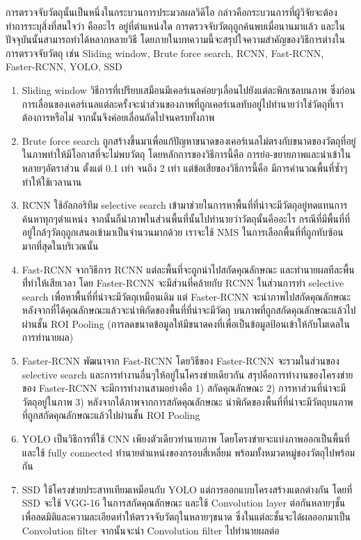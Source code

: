 การตรวจจับวัตถุนั้นเป็นหนึ่งในกระบวนการประมวลผลวิดีโอ\textsuperscript{\cite{object_detection}} กล่าวคือกระบวนการที่ผู้วิจัยจะต้องทำการระบุสิ่งที่สนใจว่า คืออะไร อยู่ที่ตำแหน่งใด การตรวจจับวัตถุถูกค้นพบเมื่อนานมาแล้ว 
และในปัจจุบันนั้นสามารถทำได้หลากหลายวิธี โดยภายในบทความนี้จะสรุปใจความสำคัญของวิธีการต่างในการตรวจจับวัตถุ เช่น Sliding window, Brute force search, RCNN, 
Fast-RCNN, Faster-RCNN, YOLO, SSD 
\begin{enumerate}
	\item Sliding window วิธีการที่เปรียบเสมือนมีเคอร์เนลค่อยๆเลื่อนไปยังแต่ละพิกเซลบนภาพ ซึ่งก่อนการเลื่อนของเคอร์เนลแต่ละครั้งจะนำส่วนของภาพที่ถูกเคอร์เนลทับอยู่ไปทำนายว่าใช่วัตถุที่เราต้องการหรือไม่ 
	จากนั้นจึงค่อยเลื่อนถัดไปจนครบทั้งภาพ
	\item Brute force search ถูกสร้างขึ้นมาเพื่อแก้ปัญหาขนาดของเคอร์เนลไม่ตรงกับขนาดของวัตถุที่อยู่ในภาพทำให้มีโอกาสที่จะไม่พบวัตถุ โดยหลักการของวิธีการนี้คือ 
	การย่อ-ขยายภาพและนำเข้าในหลายๆอัตราส่วน ตั้งแต่ 0.1 เท่า จนถึง 2 เท่า แต่ข้อเสียของวิธีการนี้คือ มีการคำนวณพื้นที่ซ้ำๆทำให้ใช้เวลานาน
	\item RCNN ใช้อัลกอริทึม selective search เข้ามาช่วยในการหาพื้นที่ที่น่าจะมีวัตถุอยู่ทดแทนการค้นหาทุกๆตำแหน่ง จากนั้นก็นำภาพในส่วนพื้นที่นั้นไปทำนายว่าวัตถุนั้นคืออะไร 
	กรณีที่มีพื้นที่ที่อยู่ใกล้ๆวัตถุถูกเสนอเข้ามาเป็นจำนวนมากด้วย เราจะใช้ NMS ในการเลือกพื้นที่ที่ถูกทับซ้อนมากที่สุดในบริเวณนั้น
	\item Fast-RCNN จากวิธีการ RCNN แต่ละพื้นที่จะถูกนำไปสกัดคุณลักษณะ และทำนายผลทีละพื้นที่่ทำให้เสียเวลา โดย Faster-RCNN จะมีส่วนที่คล้ายกับ RCNN ในส่วนการทำ 
	selective search เพื่อหาพื้นที่ที่น่าจะมีวัตถุเหมือนเดิม แต่ Faster-RCNN จะนำภาพไปสกัดคุณลักษณะ หลังจากที่ได้คุณลักษณะแล้วจะนำพิกัดของพื้นที่ที่น่าจะมีวัตถุ 
	บนภาพที่ถูกสกัดคุณลักษณะแล้วไปผ่านชั้น ROI Pooling (การลดขนาดข้อมูลให้มีขนาดคงที่เพื่อเป็นข้อมูลป้อนเข้าให้กับโมเดลในการทำนายผล)
	\item Faster-RCNN พัฒนาจาก Fast-RCNN โดยวิธีของ Faster-RCNN จะรวมในส่วนของ selective search และการทำงานอื่นๆให้อยู่ในโครงข่ายเดียวกัน 
	สรุปคือการทำงานของโครงข่ายของ Faster-RCNN จะมีการทำงานสามอย่างคือ 1) สกัดคุณลักษณะ 2) การหาส่วนที่น่าจะมีวัตถุอยู่ในภาพ 3) หลังจากได้ภาพจากการสกัดคุณลักษณะ 
	นำพิกัดของพื้นที่ที่น่าจะมีวัตถุบนภาพที่ถูกสกัดคุณลักษณะแล้วไปผ่านชั้น ROI Pooling
	\item YOLO เป็นวิธีการที่ใช้ CNN เพียงตัวเดียวทำนายภาพ โดยโครงข่ายจะแบ่งภาพออกเป็นพื้นที่ และใช้ fully connected ทำนายตำแหน่งของกรอบสี่เหลี่ยม 
	พร้อมทั้งหมวดหมู่ของวัตถุไปพร้อมกัน 
	\item SSD ใช้โครงข่ายประสาทเทียมเหมือนกับ YOLO แต่การออกแบบโครงสร้างแตกต่างกัน โดยที่ SSD จะใช้ VGG-16 ในการสกัดคุณลักษณะ และใช้ Convolution layer 
	ต่อกันหลายๆชั้นเพื่อลดมิติและความละเอียดทำให้ตรวจจับวัตถุในหลายๆขนาด ซึ่งในแต่ละชั้นจะได้ผลออกมาเป็น Convolution filter จากนั้นจะนำ Convolution filter ไปทำนายผลต่อ
\end{enumerate}